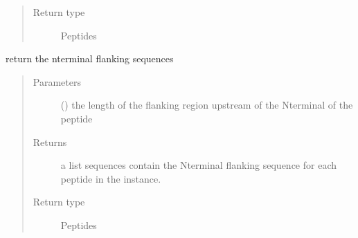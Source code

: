\documentclass[letterpaper,10pt,english]{sphinxmanual}
\begin{document}
\begin{fulllineitems}
\begin{fulllineitems}
\begin{quote}
\begin{description}
\item[{Return type}] \leavevmode
Peptides

\end{description}\end{quote}

\end{fulllineitems}


\begin{fulllineitems}
\label{\detokenize{IPTK.Classes:IPTK.Classes.Experiment.Experiment.get_n_terminal_flanked_seqs}}
return the n\sphinxhyphen{}terminal flanking sequences
\begin{quote}\begin{description}
\item[{Parameters}] \leavevmode
{} () \textendash{} the length of the flanking region upstream of the N\sphinxhyphen{}terminal of the peptide

\item[{Returns}] \leavevmode
a list sequences contain the N\sphinxhyphen{}terminal flanking sequence for each peptide in the instance.

\item[{Return type}] \leavevmode
Peptides

\end{description}\end{quote}

\end{fulllineitems}



\end{fulllineitems}
\end{document}
